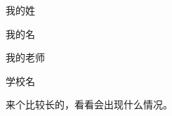 \begin{denotation}
\item[xue] 我的姓
\item[ruini] 我的名
\item[W.M. Zheng]  我的老师
\item[Tsinghua] 学校名
\item[Long] 来个比较长的，看看会出现什么情况。

\end{denotation}
